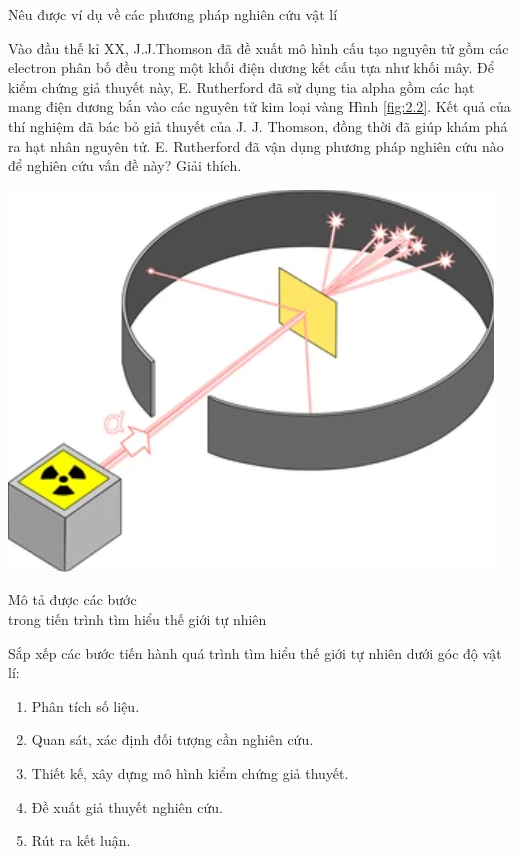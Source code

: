 \begin{dang}{Nêu được ví dụ về các phương pháp nghiên cứu vật lí}
	{Vào đầu thế kỉ XX, J.J.Thomson đã đề xuất mô hình cấu tạo nguyên tử gồm các electron phân bố đều trong một khối điện dương kết cấu tựa như khối mây. Để kiểm chứng giả thuyết này, E. Rutherford đã sử dụng tia alpha gồm các hạt mang điện dương bắn vào các nguyên tử kim loại vàng Hình \ref{fig:2.2}. Kết quả của thí nghiệm đã bác bỏ giả thuyết của J. J. Thomson, đồng thời đã giúp khám phá ra hạt nhân nguyên tử. E. Rutherford đã vận dụng phương pháp nghiên cứu nào để nghiên cứu vấn đề này? Giải thích.
	\begin{center}
		\includegraphics[width=0.3\linewidth]{../figs/VN10-2023-PH-TP002-2}
		\label{fig:2.2}
\end{center}  }
	{}
\end{dang}
\begin{dang}{Mô tả được các bước \\trong tiến trình tìm hiểu thế giới tự nhiên}
	{Sắp xếp các bước tiến hành quá trình tìm hiểu thế giới tự nhiên dưới góc độ vật lí:\\
	\begin{enumerate}[label= (\arabic*)]
		\item Phân tích số liệu.
		\item Quan sát, xác định đối tượng cần nghiên cứu.
		\item Thiết kế, xây dựng mô hình kiểm chứng giả thuyết.
		\item Đề xuất giả thuyết nghiên cứu.
		\item Rút ra kết luận.
\end{enumerate} }
	{}
\end{dang}


